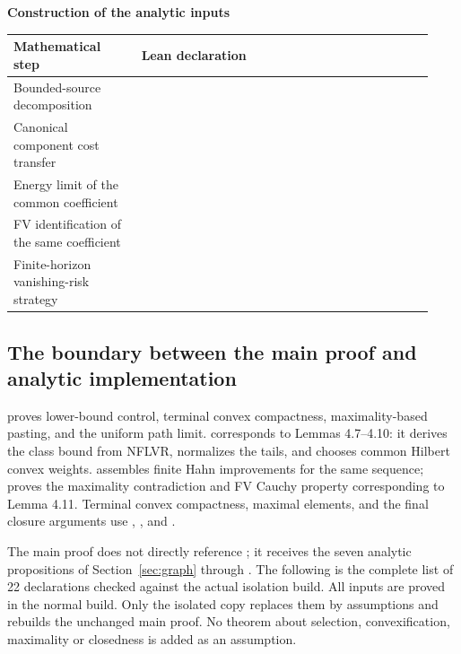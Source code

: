 \noindent\begin{minipage}{\linewidth}
\small
\textbf{Construction of the analytic inputs}\par\medskip
\begin{tabular}{L{0.29\linewidth}L{0.64\linewidth}}
\toprule
Mathematical step & Lean declaration \\
\midrule
Bounded-source decomposition &  \\
Canonical component cost transfer &  \\
Energy limit of the common coefficient &  \\
FV identification of the same coefficient &  \\
Finite-horizon vanishing-risk strategy &  \\
\bottomrule
\end{tabular}
\end{minipage}\par

\subsection*{The boundary between the main proof and analytic implementation}
 proves lower-bound control, terminal convex compactness,
maximality-based pasting, and the uniform path limit.
 corresponds to Lemmas 4.7--4.10: it derives the class
bound from NFLVR, normalizes the tails, and chooses common Hilbert convex weights.
 assembles finite Hahn improvements for the same
sequence;  proves the maximality contradiction and FV Cauchy
property corresponding to Lemma 4.11. Terminal convex compactness, maximal
elements, and the final closure arguments use ,
, and .

The main proof does not directly reference ; it receives the seven analytic propositions of Section~\ref{sec:graph} through .
The following is the complete list of 22 declarations checked against the actual isolation build.
All inputs are proved in the normal build. Only the isolated copy replaces them by assumptions and rebuilds the unchanged main proof.
No theorem about selection, convexification, maximality or closedness is added as an assumption.

